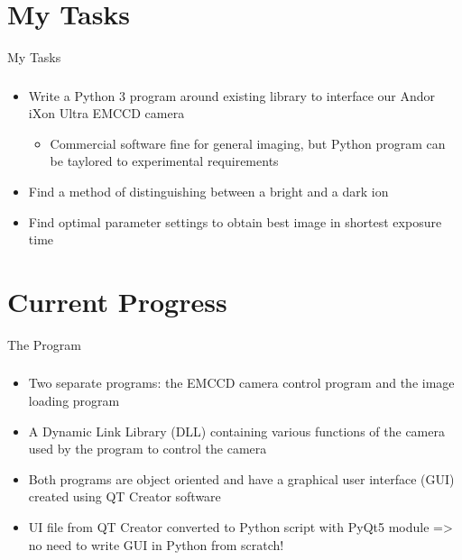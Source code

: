 \documentclass{beamer}
\begin{document}

\section{My Tasks}

\begin{frame}{My Tasks}
\frametitle{}
\begin{itemize}
\item Write a Python 3 program around existing library to interface our Andor iXon Ultra EMCCD camera
	\begin{itemize}
	\item Commercial software fine for general imaging, but Python program can be taylored to experimental requirements
	\end{itemize}
\bigskip
\item Find a method of distinguishing between a bright and a dark ion
\bigskip
\item Find optimal parameter settings to obtain best image in shortest exposure time
\end{itemize}


\end{frame}


\section{Current Progress}
\begin{frame}{The Program}
\frametitle{}

\begin{itemize}
\item Two separate programs: the EMCCD camera control program and the image loading program
\bigskip
\item A Dynamic Link Library (DLL) containing various functions of the camera used by the program to control the camera
\bigskip
\item Both programs are object oriented and have a graphical user interface (GUI) created using QT Creator software
\bigskip
\item UI file from QT Creator converted to Python script with PyQt5 module => no need to write GUI in Python from scratch!
\end{itemize} 


\end{frame}
\end{document}
